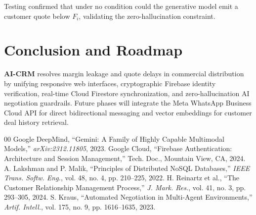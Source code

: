 \documentclass[conference]{IEEEtran}
\begin{document}
Testing confirmed that under no condition could the generative model emit a customer quote below $F_i$, validating the zero-hallucination constraint.

\section{Conclusion and Roadmap}
\label{sec:conclusion}

\textbf{AI-CRM} resolves margin leakage and quote delays in commercial distribution by unifying responsive web interfaces, cryptographic Firebase identity verification, real-time Cloud Firestore synchronization, and zero-hallucination AI negotiation guardrails. Future phases will integrate the Meta WhatsApp Business Cloud API for direct bidirectional messaging and vector embeddings for customer deal history retrieval.

\begin{thebibliography}{00}
 Google DeepMind, ``Gemini: A Family of Highly Capable Multimodal Models,'' \emph{arXiv:2312.11805}, 2023.
 Google Cloud, ``Firebase Authentication: Architecture and Session Management,'' Tech. Doc., Mountain View, CA, 2024.
 A. Lakshman and P. Malik, ``Principles of Distributed NoSQL Databases,'' \emph{IEEE Trans. Softw. Eng.}, vol. 48, no. 4, pp. 210--225, 2022.
 H. Reinartz et al., ``The Customer Relationship Management Process,'' \emph{J. Mark. Res.}, vol. 41, no. 3, pp. 293--305, 2024.
 S. Kraus, ``Automated Negotiation in Multi-Agent Environments,'' \emph{Artif. Intell.}, vol. 175, no. 9, pp. 1616--1635, 2023.
\end{thebibliography}
\end{document}
